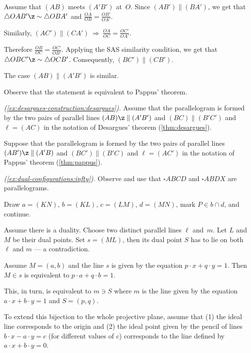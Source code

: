 Assume that $(AB)$ meets $(A'B')$ at~$O$.
Since $(AB')\parallel (BA')$, we get that $\triangle OAB'\z\sim\triangle OBA'$
and
$\frac{OA}{OB}=\frac{OB'}{OA'}$.

Similarly, $(AC')\parallel (CA')\ \Longrightarrow\ \frac{OA}{OC}=\frac{OC'}{OA'}$.

Therefore
$\frac{OB}{OC}=\frac{OC'}{OB'}$.
Applying the SAS similarity condition, we get that
$\triangle OBC'\z\sim\triangle OCB'$.
Consequently, $(BC')\parallel (CB')$.

The case $(AB)\parallel(A'B')$ is similar.

 Observe that the statement is equivalent to Pappus' theorem.

\parbf{\ref{ex:desargues-construction};} \textit{(\ref{ex:desargues-construction:desargues}).}
Assume that the parallelogram is formed by the two pairs of parallel lines $(AB)\z\parallel (A'B')$ and $(BC)\parallel(B'C')$ and $\ell=(AC)$ in the notation of Desargues' theorem (\ref{thm:desargues}).

 Suppose that the parallelogram is formed by the two pairs of parallel lines $(AB')\z\parallel (A'B)$ and $(BC')\parallel(B'C)$ and $\ell=(AC')$ in the notation of Pappus' theorem (\ref{thm:pappus}).

\parbf{\ref{ex:dual-configurations};}
\textit{(\ref{ex:dual-configurations:infty}).} Observe and use that $\square ABCD$ and $\square ABDX$ are parallelograms.

Draw $a=(KN)$, $b=(KL)$, $c=(LM)$, $d=(MN)$, mark $P\in b\cap d$, and continue.

Assume there is a duality.
Choose two distinct parallel lines $\ell$ and~$m$.
Let $L$ and $M$ be their dual points.
Set $s=(ML)$, then its dual point $S$ has to lie on both $\ell$ and $m$ --- a contradiction.

Assume $M=(a,b)$ 
and the line $s$ is given by the equation $p\cdot x+q\cdot y=1$.
Then $M\in s$ is equivalent to $p\cdot a+q\cdot b=1$.

This, in turn, is equivalent to $m\ni S$
where $m$ is the line given by the equation 
$a\cdot x+b\cdot y=1$ and $S=(p,q)$.

To extend this bijection to the whole projective plane, assume that 
(1) the ideal line corresponds to the origin 
and (2) the ideal point given by the pencil of lines $b\cdot x-a\cdot y=c$ (for different values of $c$) corresponds to the line defined by $a\cdot x+b\cdot y=0$.

